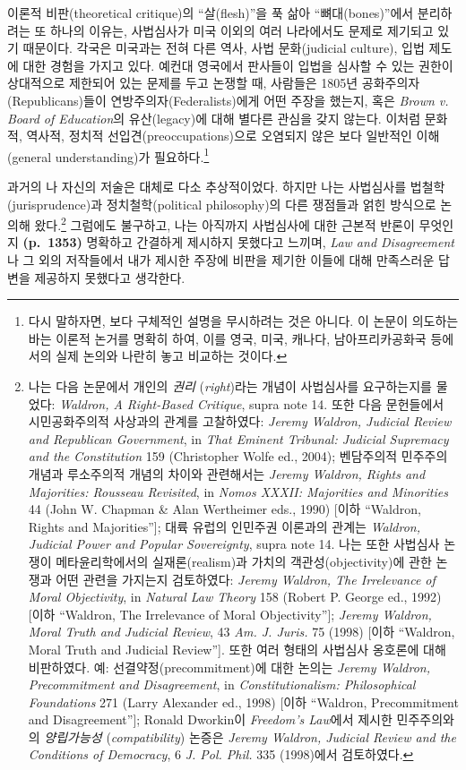 \documentclass[a4paper,12pt,oneside]{article}  %
\newcommand{\emphksans}[1]{%
  {\kopubhangul\kopublatin\textsl{#1}}%
}
\begin{document}
이론적 비판(theoretical critique)의 ``살(flesh)''을 푹 삶아
``뼈대(bones)''에서 분리하려는 또 하나의 이유는, 사법심사가 미국 이외의
여러 나라에서도 문제로 제기되고 있기 때문이다. 각국은 미국과는 전혀 다른
역사, 사법 문화(judicial culture), 입법 제도에 대한 경험을 가지고 있다.
예컨대 영국에서 판사들이 입법을 심사할 수 있는 권한이 상대적으로
제한되어 있는 문제를 두고 논쟁할 때, 사람들은 1805년
공화주의자(Republicans)들이 연방주의자(Federalists)에게 어떤 주장을
했는지, 혹은 \emph{Brown v. Board of Education}의 유산(legacy)에 대해
별다른 관심을 갖지 않는다. 이처럼 문화적, 역사적, 정치적
선입견(preoccupations)으로 오염되지 않은 보다 일반적인 이해(general
understanding)가 필요하다.\footnote{다시 말하자면, 보다 구체적인 설명을
  무시하려는 것은 아니다. 이 논문이 의도하는 바는 이론적 논거를 명확히
  하여, 이를 영국, 미국, 캐나다, 남아프리카공화국 등에서의 실제 논의와
  나란히 놓고 비교하는 것이다.}

과거의 나 자신의 저술은 대체로 다소 추상적이었다. 하지만 나는 사법심사를
법철학(jurisprudence)과 정치철학(political philosophy)의 다른 쟁점들과
얽힌 방식으로 논의해 왔다.\footnote{나는 다음 논문에서 개인의
  \emphksans{권리}(\emph{right})라는 개념이 사법심사를 요구하는지를 물었다:
  \emph{Waldron, A Right-Based Critique}, supra note 14. 또한 다음
  문헌들에서 시민공화주의적 사상과의 관계를 고찰하였다: \emph{Jeremy
  Waldron, Judicial Review and Republican Government}, in \emph{That
  Eminent Tribunal: Judicial Supremacy and the Constitution} 159
  (Christopher Wolfe ed., 2004); 벤담주의적 민주주의 개념과 루소주의적
  개념의 차이와 관련해서는 \emph{Jeremy Waldron, Rights and Majorities:
  Rousseau Revisited}, in \emph{Nomos XXXII: Majorities and Minorities}
  44 (John W. Chapman \& Alan Wertheimer eds., 1990) {[}이하 ``Waldron,
  Rights and Majorities''{]}; 대륙 유럽의 인민주권 이론과의 관계는
  \emph{Waldron, Judicial Power and Popular Sovereignty}, supra note 14.
  나는 또한 사법심사 논쟁이 메타윤리학에서의 실재론(realism)과 가치의
  객관성(objectivity)에 관한 논쟁과 어떤 관련을 가지는지 검토하였다:
  \emph{Jeremy Waldron, The Irrelevance of Moral Objectivity}, in
  \emph{Natural Law Theory} 158 (Robert P. George ed., 1992) {[}이하
  ``Waldron, The Irrelevance of Moral Objectivity''{]}; \emph{Jeremy
  Waldron, Moral Truth and Judicial Review}, 43 \emph{Am. J. Juris.} 75
  (1998) {[}이하 ``Waldron, Moral Truth and Judicial Review''{]}. 또한
  여러 형태의 사법심사 옹호론에 대해 비판하였다. 예:
  선결약정(precommitment)에 대한 논의는 \emph{Jeremy Waldron,
  Precommitment and Disagreement}, in \emph{Constitutionalism:
  Philosophical Foundations} 271 (Larry Alexander ed., 1998) {[}이하
  ``Waldron, Precommitment and Disagreement''{]}; Ronald Dworkin이
  \emph{Freedom's Law}에서 제시한 민주주의와의
  \emphksans{양립가능성}(\emph{compatibility}) 논증은 \emph{Jeremy Waldron, Judicial
  Review and the Conditions of Democracy}, 6 \emph{J. Pol. Phil.} 335
  (1998)에서 검토하였다.} 그럼에도 불구하고, 나는 아직까지 사법심사에
대한 근본적 반론이 무엇인지 \textbf{(p.~1353)} 명확하고 간결하게
제시하지 못했다고 느끼며, \emph{Law and Disagreement}나 그 외의
저작들에서 내가 제시한 주장에 비판을 제기한 이들에 대해 만족스러운
답변을 제공하지 못했다고 생각한다.
\end{document}
